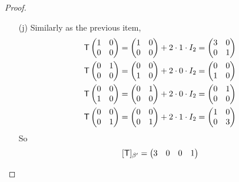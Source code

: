 \begin{proof}
\begin{enumerate}
\item[(j)]
Similarly as the previous item,
\begin{align*}
    \textsf{T} \begin{pmatrix} 1 & 0 \\ 0 & 0 \end{pmatrix}
        & = \begin{pmatrix} 1 & 0 \\ 0 & 0 \end{pmatrix} + 2 \cdot 1 \cdot I_2
        = \begin{pmatrix} 3 & 0 \\ 0 & 1 \end{pmatrix} \\
    \textsf{T} \begin{pmatrix} 0 & 1 \\ 0 & 0 \end{pmatrix}
        & = \begin{pmatrix} 0 & 0 \\ 1 & 0 \end{pmatrix} + 2 \cdot 0 \cdot I_2
        = \begin{pmatrix} 0 & 0 \\ 1 & 0 \end{pmatrix} \\
    \textsf{T} \begin{pmatrix} 0 & 0 \\ 1 & 0 \end{pmatrix}
        & = \begin{pmatrix} 0 & 1 \\ 0 & 0 \end{pmatrix} + 2 \cdot 0 \cdot I_2
        = \begin{pmatrix} 0 & 1 \\ 0 & 0 \end{pmatrix} \\
    \textsf{T} \begin{pmatrix} 0 & 0 \\ 0 & 1 \end{pmatrix}
        & = \begin{pmatrix} 0 & 0 \\ 0 & 1 \end{pmatrix} + 2 \cdot 1 \cdot I_2
        = \begin{pmatrix} 1 & 0 \\ 0 & 3 \end{pmatrix}
\end{align*}
So
\[
    [\textsf{T}]_{\beta'} = \begin{pmatrix}
        3 & 0 & 0 & 1 \\

\end{pmatrix}\]
\end{enumerate}
\end{proof}
